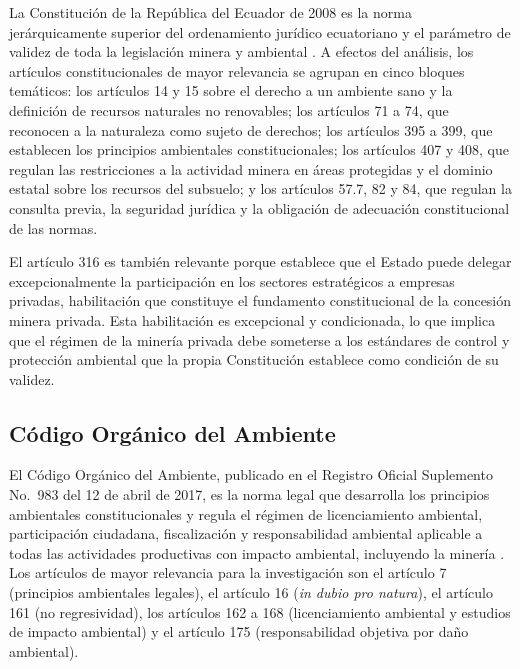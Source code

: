 La Constitución de la República del Ecuador de 2008 es la norma jerárquicamente superior del ordenamiento jurídico ecuatoriano y el parámetro de validez de toda la legislación minera y ambiental \parencite{cre_2008}. A efectos del análisis, los artículos constitucionales de mayor relevancia se agrupan en cinco bloques temáticos: los artículos 14 y 15 sobre el derecho a un ambiente sano y la definición de recursos naturales no renovables; los artículos 71 a 74, que reconocen a la naturaleza como sujeto de derechos; los artículos 395 a 399, que establecen los principios ambientales constitucionales; los artículos 407 y 408, que regulan las restricciones a la actividad minera en áreas protegidas y el dominio estatal sobre los recursos del subsuelo; y los artículos 57.7, 82 y 84, que regulan la consulta previa, la seguridad jurídica y la obligación de adecuación constitucional de las normas.

El artículo 316 es también relevante porque establece que el Estado puede delegar excepcionalmente la participación en los sectores estratégicos a empresas privadas, habilitación que constituye el fundamento constitucional de la concesión minera privada. Esta habilitación es excepcional y condicionada, lo que implica que el régimen de la minería privada debe someterse a los estándares de control y protección ambiental que la propia Constitución establece como condición de su validez.

\subsection{Código Orgánico del Ambiente}

El Código Orgánico del Ambiente, publicado en el Registro Oficial Suplemento No.\ 983 del 12 de abril de 2017, es la norma legal que desarrolla los principios ambientales constitucionales y regula el régimen de licenciamiento ambiental, participación ciudadana, fiscalización y responsabilidad ambiental aplicable a todas las actividades productivas con impacto ambiental, incluyendo la minería \parencite{coa_2017}. Los artículos de mayor relevancia para la investigación son el artículo 7 (principios ambientales legales), el artículo 16 (\textit{in dubio pro natura}), el artículo 161 (no regresividad), los artículos 162 a 168 (licenciamiento ambiental y estudios de impacto ambiental) y el artículo 175 (responsabilidad objetiva por daño ambiental).

